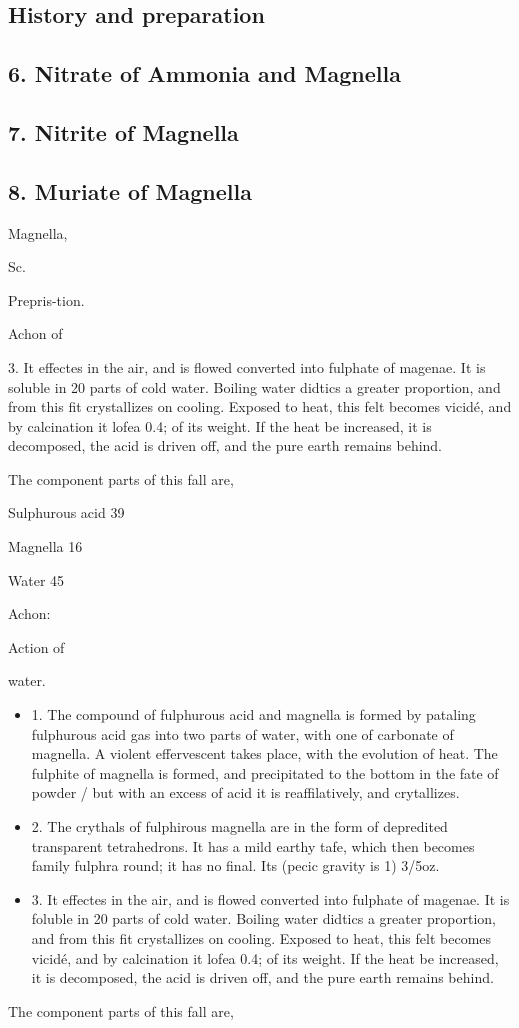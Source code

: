 \documentclass{article}
\begin{document}
\subsection*{History and preparation}
\subsection*{6. Nitrate of Ammonia and Magnella}
\subsection*{7. Nitrite of Magnella}
\subsection*{8. Muriate of Magnella}
Magnella,

Sc.

Prepris-tion.

Achon of

3. It effectes in the air, and is flowed converted into fulphate of magenae. It is soluble in 20 parts of cold water. Boiling water didtics a greater proportion, and from this fit crystallizes on cooling. Exposed to heat, this felt becomes vicidé, and by calcination it lofea 0.4; of its weight. If the heat be increased, it is decomposed, the acid is driven off, and the pure earth remains behind.

The component parts of this fall are,

Sulphurous acid 39

Magnella 16

Water 45

Achon:

Action of

water.

\begin{itemize}
\item 1. The compound of fulphurous acid and magnella is formed by pataling fulphurous acid gas into two parts of water, with one of carbonate of magnella. A violent effervescent takes place, with the evolution of heat. The fulphite of magnella is formed, and precipitated to the bottom in the fate of powder / but with an excess of acid it is reaffilatively, and crytallizes.
\item 2. The crythals of fulphirous magnella are in the form of depredited transparent tetrahedrons. It has a mild earthy tafe, which then becomes family fulphra round; it has no final. Its (pecic gravity is 1) 3/5oz.
\item 3. It effectes in the air, and is flowed converted into fulphate of magenae. It is foluble in 20 parts of cold water. Boiling water didtics a greater proportion, and from this fit crystallizes on cooling. Exposed to heat, this felt becomes vicidé, and by calcination it lofea 0.4; of its weight. If the heat be increased, it is decomposed, the acid is driven off, and the pure earth remains behind.
\end{itemize}
The component parts of this fall are,
\end{document}
